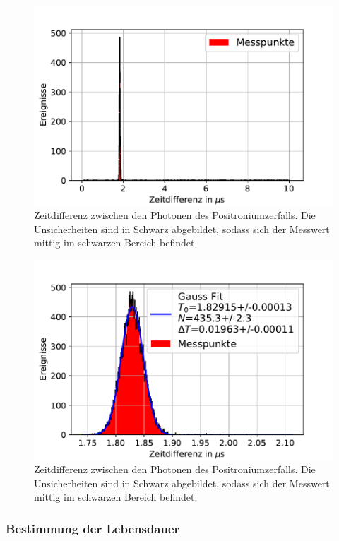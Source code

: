\documentclass[
	a4paper,
	12pt,
	pagesize,
	ngerman
]{scrartcl}
\begin{document}
	\begin{figure}[H]
				\includegraphics[width= 0.9 \linewidth]{img/Positronium_Zeitdifferenz}
				\caption{
				Zeitdifferenz zwischen den Photonen des Positroniumzerfalls.
				Die Unsicherheiten sind in Schwarz abgebildet, sodass sich der Messwert mittig im schwarzen Bereich befindet.
				}
				\label{fig_positronium_zeitdifferenzen}
		\end{figure}

	\begin{figure}[H]
				\includegraphics[width= 0.9 \linewidth]{img/Positronium_Zeitdifferenz_zoom}
				\caption{
				Zeitdifferenz zwischen den Photonen des Positroniumzerfalls.
				Die Unsicherheiten sind in Schwarz abgebildet, sodass sich der Messwert mittig im schwarzen Bereich befindet.
				}
				\label{fig_positronium_zeitdifferenzen_zoom}
		\end{figure}

		\subsubsection{Bestimmung der Lebensdauer}
\end{document}
